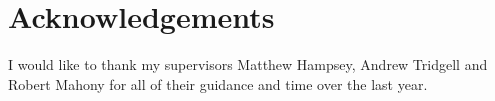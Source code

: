 \chapter*{Acknowledgements}

I would like to thank my supervisors Matthew Hampsey, Andrew Tridgell and Robert Mahony for all of their guidance and time over the last year.
